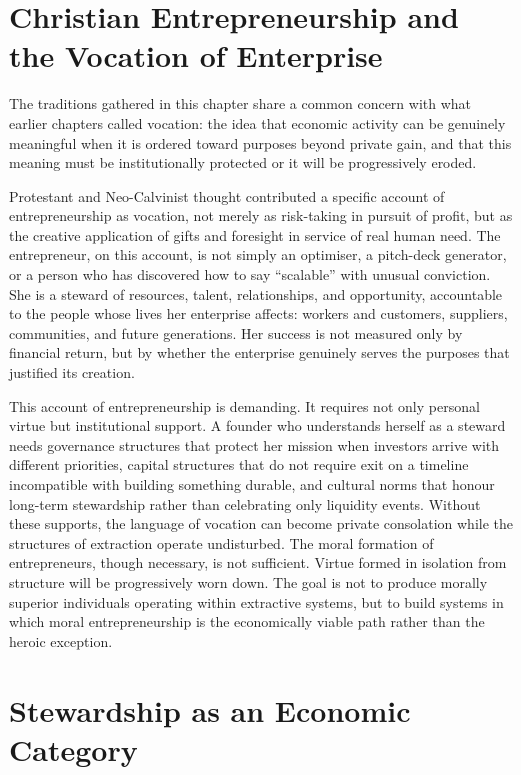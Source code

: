 \documentclass[11pt,a4paper,oneside]{book}
\begin{document}
\section*{Christian Entrepreneurship and the Vocation of Enterprise}

The traditions gathered in this chapter share a common concern with what earlier chapters called vocation: the idea that economic activity can be genuinely meaningful when it is ordered toward purposes beyond private gain, and that this meaning must be institutionally protected or it will be progressively eroded.

Protestant and Neo-Calvinist thought contributed a specific account of entrepreneurship as vocation, not merely as risk-taking in pursuit of profit, but as the creative application of gifts and foresight in service of real human need. The entrepreneur, on this account, is not simply an optimiser, a pitch-deck generator, or a person who has discovered how to say ``scalable'' with unusual conviction. She is a steward of resources, talent, relationships, and opportunity, accountable to the people whose lives her enterprise affects: workers and customers, suppliers, communities, and future generations. Her success is not measured only by financial return, but by whether the enterprise genuinely serves the purposes that justified its creation.

This account of entrepreneurship is demanding. It requires not only personal virtue but institutional support. A founder who understands herself as a steward needs governance structures that protect her mission when investors arrive with different priorities, capital structures that do not require exit on a timeline incompatible with building something durable, and cultural norms that honour long-term stewardship rather than celebrating only liquidity events. Without these supports, the language of vocation can become private consolation while the structures of extraction operate undisturbed. The moral formation of entrepreneurs, though necessary, is not sufficient. Virtue formed in isolation from structure will be progressively worn down. The goal is not to produce morally superior individuals operating within extractive systems, but to build systems in which moral entrepreneurship is the economically viable path rather than the heroic exception.

\section*{Stewardship as an Economic Category}
\end{document}

